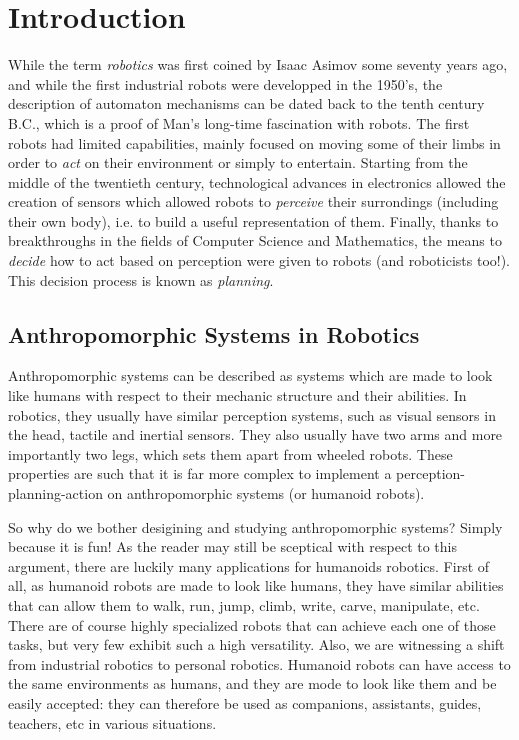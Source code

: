 \chapter{Introduction}
\label{chap:chap0}

While the term \emph{robotics} was first coined by Isaac Asimov some
seventy years ago, and while the first industrial robots were
developped in the 1950's, the description of automaton mechanisms can
be dated back to the tenth century B.C., which is a proof of Man's
long-time fascination with robots. The first robots had limited
capabilities, mainly focused on moving some of their limbs in order to
\emph{act} on their environment or simply to entertain. Starting from
the middle of the twentieth century, technological advances in
electronics allowed the creation of sensors which allowed robots to
\emph{perceive} their surrondings (including their own body), i.e. to
build a useful representation of them. Finally, thanks to
breakthroughs in the fields of Computer Science and Mathematics, the
means to \emph{decide} how to act based on perception were given to
robots (and roboticists too!). This decision process is known as
\emph{planning}.

\section{Anthropomorphic Systems in Robotics}

Anthropomorphic systems can be described as systems which are made to
look like humans with respect to their mechanic structure and their
abilities. In robotics, they usually have similar perception systems,
such as visual sensors in the head, tactile and inertial sensors. They
also usually have two arms and more importantly two legs, which sets
them apart from wheeled robots. These properties are such that it is
far more complex to implement a perception-planning-action on
anthropomorphic systems (or humanoid robots).

So why do we bother desigining and studying anthropomorphic systems?
Simply because it is fun! As the reader may still be sceptical with
respect to this argument, there are luckily many applications for
humanoids robotics. First of all, as humanoid robots are made to look
like humans, they have similar abilities that can allow them to walk,
run, jump, climb, write, carve, manipulate, etc. There are of course
highly specialized robots that can achieve each one of those tasks,
but very few exhibit such a high versatility. Also, we are witnessing
a shift from industrial robotics to personal robotics. Humanoid robots
can have access to the same environments as humans, and they are mode
to look like them and be easily accepted: they can therefore be used
as companions, assistants, guides, teachers, etc in various
situations.

